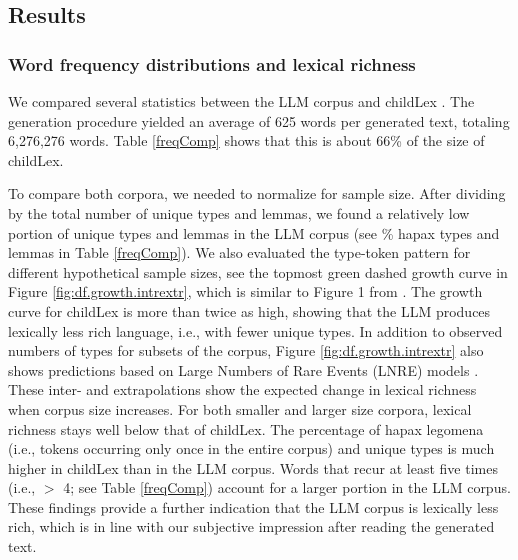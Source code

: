 \documentclass[manuscript]{stjour}
\begin{document}
\subsection{Results}

\subsubsection*{Word frequency distributions and lexical richness}

We compared several statistics between the LLM corpus and childLex \citep{schroeder_childlex_2015}. The generation procedure yielded an average of 625 words per generated text, totaling 6,276,276 words. Table \ref{freqComp} shows that this is about 66\% of the size of childLex. 

To compare both corpora, we needed to normalize for sample size. After dividing by the total number of unique types and lemmas, we found a relatively low portion of unique types and lemmas in the LLM corpus (see \% hapax types and lemmas in Table \ref{freqComp}). We also evaluated the type-token pattern for different hypothetical sample sizes, see the topmost green dashed growth curve in Figure \ref{fig:df.growth.intrextr}, which is similar to Figure 1 from \citep{schroeder_childlex_2015}. The growth curve for childLex is more than twice as high, showing that the LLM produces lexically less rich language, i.e., with fewer unique types. In addition to observed numbers of types for subsets of the corpus, Figure \ref{fig:df.growth.intrextr} also shows predictions based on Large Numbers of Rare Events (LNRE) models \citep{evert_simple_2004, baayen_word_2001}. These inter- and extrapolations show the expected change in lexical richness when corpus size increases. For both smaller and larger size corpora, lexical richness stays well below that of childLex. The percentage of hapax legomena (i.e., tokens occurring only once in the entire corpus) and unique types is much higher in childLex than in the LLM corpus. Words that recur at least five times (i.e., $>$ 4; see Table \ref{freqComp}) account for a larger portion in the LLM corpus. These findings provide a further indication that the LLM corpus is lexically less rich, which is in line with our subjective impression after reading the generated text. 
 
\end{document}
